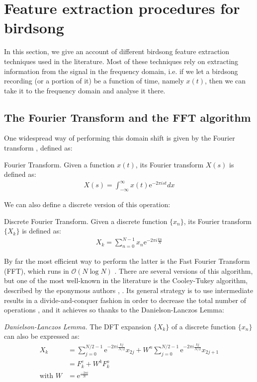 \documentclass[../main.tex]{subfiles}
\begin{document}
\section{Feature extraction procedures for birdsong} \label{features_review}
In this section, we give an account of different birdsong feature extraction techniques used in the literature. Most of these techniques rely on extracting information from the signal in the frequency domain, i.e. if we let a birdsong recording (or a portion of it) be a function of time, namely $x(t)$, then we can take it to the frequency domain and analyse it there. 
\subsection{The Fourier Transform and the FFT algorithm}
\par One widespread way of performing this domain shift is given by the Fourier transform \cite{Weisstein2015}, defined as:
\theoremstyle{definition}
\begin{definition}{Fourier Transform}.
Given a function $x(t)$, its Fourier transform $X(s)$ is defined as:
\begin{align*}
X(s) = \int_{-\infty}^{\infty}x(t)\mathrm{e}^{-2\pi ist}dx
\end{align*}
\end{definition}
\par We can also define a discrete version of this operation:
\begin{definition}{Discrete Fourier Transform}.
Given a discrete function $\{x_n\}$, its Fourier transform $\{X_k\}$ is defined as:
\begin{align*}
X_k = \sum_{n=0}^{N-1}x_n\mathrm{e}^{-2\pi i\frac{kn}{N}}
\end{align*}
\end{definition}
\par By far the most efficient way to perform the latter is the Fast Fourier Transform (FFT), which runs in $\mathcal{O}(N\log{N})$ \cite{Smith2011}. There are several versions of this algorithm, but one of the most well-known in the literature is the Cooley-Tukey algorithm, described by the eponymous authors \cite{Cooley1965}, \cite{Weisstein2015}. Its general strategy is to use intermediate results in a divide-and-conquer fashion in order to decrease the total number of operations \cite{Weisstein2015}, and it achieves so thanks to the Danielson-Lanczos Lemma:
\begin{lemma}
\emph{Danielson-Lanczos Lemma.} The DFT expansion $\{X_k\}$ of a discrete function $\{x_n\}$ can also be expressed as:\\
\begin{align*}
X_k &= \sum_{j=0}^{N/2-1}\mathrm{e}^{-2\pi i\frac{kj}{N/2}}x_{2j} + W^n\sum_{j=0}^{N/2-1}\mathrm{e}^{-2\pi i\frac{kj}{N/2}}x_{2j+1}\\
&=F^e_k + W^kF^o_k \\
\text{with } W &= \mathrm{e}^ {\frac{-2\pi i}{N} }
\end{align*}
\end{lemma}
\end{document}
